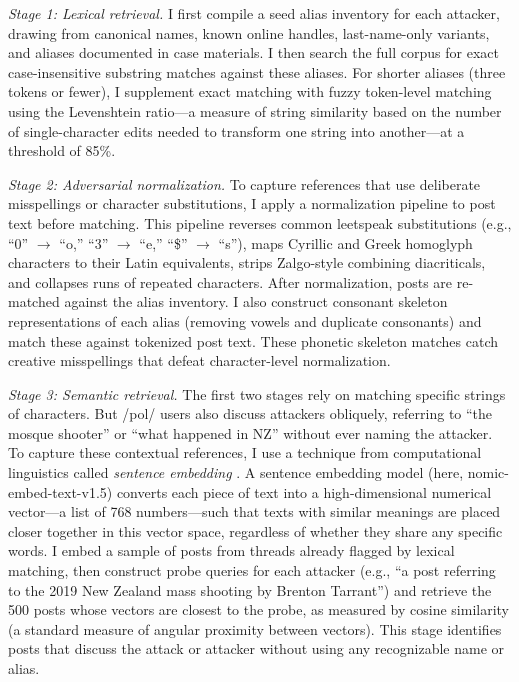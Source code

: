 \documentclass[12pt]{article}
\begin{document}
\textit{Stage 1: Lexical retrieval.} I first compile a seed alias inventory for each attacker, drawing from canonical names, known online handles, last-name-only variants, and aliases documented in case materials. I then search the full corpus for exact case-insensitive substring matches against these aliases. For shorter aliases (three tokens or fewer), I supplement exact matching with fuzzy token-level matching using the Levenshtein ratio---a measure of string similarity based on the number of single-character edits needed to transform one string into another---at a threshold of 85\%.

\textit{Stage 2: Adversarial normalization.} To capture references that use deliberate misspellings or character substitutions, I apply a normalization pipeline to post text before matching. This pipeline reverses common leetspeak substitutions (e.g., ``0'' $\rightarrow$ ``o,'' ``3'' $\rightarrow$ ``e,'' ``\$'' $\rightarrow$ ``s''), maps Cyrillic and Greek homoglyph characters to their Latin equivalents, strips Zalgo-style combining diacriticals, and collapses runs of repeated characters. After normalization, posts are re-matched against the alias inventory. I also construct consonant skeleton representations of each alias (removing vowels and duplicate consonants) and match these against tokenized post text. These phonetic skeleton matches catch creative misspellings that defeat character-level normalization.

\textit{Stage 3: Semantic retrieval.} The first two stages rely on matching specific strings of characters. But /pol/ users also discuss attackers obliquely, referring to ``the mosque shooter'' or ``what happened in NZ'' without ever naming the attacker. To capture these contextual references, I use a technique from computational linguistics called \textit{sentence embedding} \parencite{reimers2019sentencebert}. A sentence embedding model (here, nomic-embed-text-v1.5) converts each piece of text into a high-dimensional numerical vector---a list of 768 numbers---such that texts with similar meanings are placed closer together in this vector space, regardless of whether they share any specific words. I embed a sample of posts from threads already flagged by lexical matching, then construct probe queries for each attacker (e.g., ``a post referring to the 2019 New Zealand mass shooting by Brenton Tarrant'') and retrieve the 500 posts whose vectors are closest to the probe, as measured by cosine similarity (a standard measure of angular proximity between vectors). This stage identifies posts that discuss the attack or attacker without using any recognizable name or alias.
\end{document}
